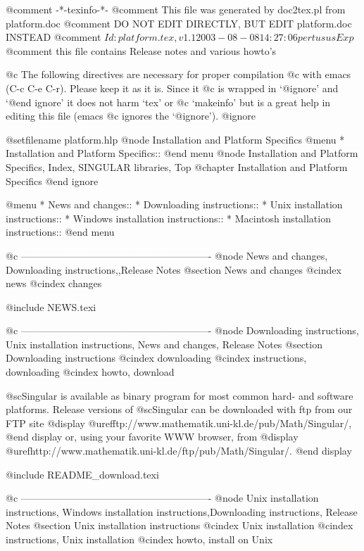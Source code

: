 @comment -*-texinfo-*-
@comment This file was generated by doc2tex.pl from platform.doc
@comment DO NOT EDIT DIRECTLY, BUT EDIT platform.doc INSTEAD
@comment $Id: platform.tex,v 1.1 2003-08-08 14:27:06 pertusus Exp $
@comment this file contains Release notes and various howto's

@c The following directives are necessary for proper compilation
@c with emacs (C-c C-e C-r).  Please keep it as it is.  Since it
@c is wrapped in `@ignore' and `@end ignore' it does not harm `tex' or
@c `makeinfo' but is a great help in editing this file (emacs
@c ignores the `@ignore').
@ignore

@setfilename platform.hlp
@node Installation and Platform Specifics
@menu
* Installation and Platform Specifics::
@end menu
@node Installation and Platform Specifics, Index, SINGULAR libraries, Top
@chapter Installation and Platform Specifics
@end ignore

@menu
* News and changes::
* Downloading instructions::
* Unix installation instructions::
* Windows installation instructions::
* Macintosh installation instructions::
@end menu

@c ----------------------------------------------------------
@node News and changes, Downloading instructions,,Release Notes
@section News and changes
@cindex news
@cindex changes

@include NEWS.texi

@c ----------------------------------------------------------
@node Downloading instructions, Unix installation instructions, News and changes, Release Notes
@section Downloading instructions
@cindex downloading
@cindex instructions, downloading
@cindex howto, download

@sc{Singular} is available as binary program for most common hard-
and software platforms. Release versions of @sc{Singular} can be
downloaded with ftp from our FTP site
@display
@uref{ftp://www.mathematik.uni-kl.de/pub/Math/Singular/},
@end display
or, using your favorite WWW browser, from
@display
@uref{http://www.mathematik.uni-kl.de/ftp/pub/Math/Singular/}.
@end display

@include README_download.texi

@c ----------------------------------------------------------
@node Unix installation instructions, Windows installation instructions,Downloading instructions, Release Notes
@section Unix installation instructions
@cindex Unix installation
@cindex instructions, Unix installation
@cindex howto, install on Unix

